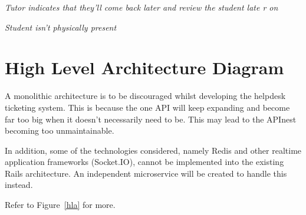 \documentclass[12pt,a4paper,]{article}
\begin{document}
\vspace{1em}
\noindent
\emph{Tutor indicates that they'll come back later and review the
\vspace{1em}student late
r on}

\noindent
{}

\vspace{1em}
\noindent
\emph{Student isn't physically present}
\vspace{1em}

\noindent
{}

\section{High Level Architecture
Diagram}\label{high-level-architecture-diagram}

A monolithic architecture is to be discouraged whilst developing the helpdesk
ticketing system. This is because the one API will keep expanding and become
far too big when it doesn't necessarily need to be. This may lead to the APInest
becoming too unmaintainable.

In addition, some of the technologies considered, namely Redis and other realtime
application frameworks (Socket.IO), cannot be implemented into the existing
Rails architecture. An independent microservice will be created to handle this
instead.

Refer to Figure~\ref{hla} for more.
\end{document}
